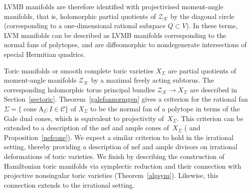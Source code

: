 \documentclass[a4paper]{amsart}
\theoremstyle{definition}
\theoremstyle{remark}
\numberwithin{equation}{section}
\def\cone{\mathop{\mathrm{cone}}}
\def\relint{\mathop{\mathrm{relint}}}
\newcommand{\zk}{\mathcal Z_{\mathcal K}}
\newcommand{\<}{\langle}
\renewcommand{\>}{\rangle}
\begin{document}
LVMB manifolds are therefore identified with projectivised moment-angle manifolds, that is, holomorphic partial quotients of $\zk$ by the diagonal circle (corresponding to a one-dimensional rational subspace $Q\subset V$). In these terms, LVM manifolds can be described as LVMB manifolds corresponding to the normal fans of polytopes, and are diffeomorphic to nondegenerate intersections of special Hermitian quadrics.

Toric manifolds or smooth complete toric varieties $X_\Sigma$ are partial quotients of moment-angle manifolds $\zk$ by a maximal freely acting subtorus. The corresponding holomorphic torus principal bundles $\zk\to X_\Sigma$ are described in Section~\ref{sectoric}.  Theorem~\ref{galefannormgen} gives a criterion for the rational fan $\Sigma=\{\cone\mathrm A_I\colon I\in\mathcal C\}$ of $X_\Sigma$ to 
be the normal fan of a polytope in terms of the Gale dual cones, which is equivalent to projectivity of~$X_\Sigma$. This criterion can be extended to a description of the nef and ample cones of~$X_\Sigma$ (\cite[Proposition~2.4.2.6]{a-d-h-l15} and Proposition~\ref{nefcone}). We expect a similar criterion to hold in the irrational setting, thereby providing a description of nef and ample divisors on irrational deformations of toric varieties. We finish by describing the construction of Hamiltonian toric manifolds via symplectic reduction and their connection with projective nonsingular toric varieties (Theorem~\ref{algsym}). Likewise, this connection extends to the irrational setting.
\end{document}
